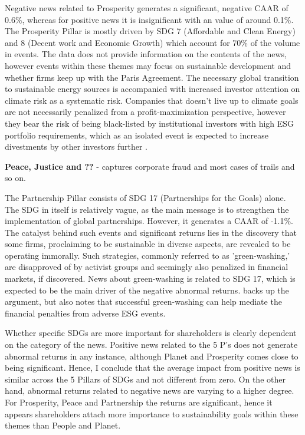 Negative news related to Prosperity generates a significant, negative CAAR of 0.6\%, whereas for positive news it is insignificant with an value of around 0.1\%. The Prosperity Pillar is mostly driven by SDG 7 (Affordable and Clean Energy) and 8 (Decent work and Economic Growth) which account for 70\% of the volume in events. The data does not provide information on the contents of the news, however events within these themes may focus on sustainable development and whether firms keep up with the Paris Agreement. The necessary global transition to sustainable energy sources is accompanied with increased investor attention on climate risk as a systematic risk. Companies that doesn't live up to climate goals are not necessarily penalized from a profit-maximization perspective, however they bear the risk of being black-listed by institutional investors with high ESG portfolio requirements, which as an isolated event is expected to increase divestments by other investors further \cite{dell2021norwegian}. 

\textbf{Peace, Justice and ??} - captures corporate fraud and most cases of trails and so on. 


The Partnership Pillar consists of SDG 17 (Partnerships for the Goals) alone. The SDG in itself is relatively vague, as the main message is to strengthen the implementation of global partnerships. However, it generates a CAAR of -1.1\%. The catalyst behind such events and significant returns lies in the discovery that some firms, proclaiming to be sustainable in diverse aspects, are revealed to be operating immorally. Such strategies, commonly referred to as 'green-washing,' are disapproved of by activist groups and seemingly also penalized in financial markets, if discovered. News about green-washing is related to SDG 17, which is expected to be the main driver of the negative abnormal returns. \cite{Blancard_ESG_sentiment} backs up the argument, but also notes that successful green-washing can help mediate the financial penalties from adverse ESG events.  


Whether specific SDGs are more important for shareholders is clearly dependent on the category of the news. Positive news related to the 5 P's does not generate abnormal returns in any instance, although Planet and Prosperity comes close to being significant. Hence, I conclude that the average impact from positive news is similar across the 5 Pillars of SDGs and not different from zero. On the other hand, abnormal returns related to negative news are varying to a higher degree. For Prosperity, Peace and Partnership the returns are significant, hence it appears shareholders attach more importance to sustainability goals within these themes than People and Planet.    

